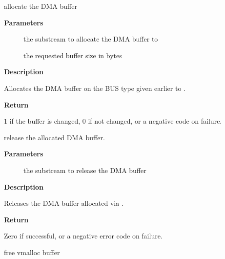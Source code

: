 \documentclass[a4paper,8pt,english]{sphinxmanual}
\begin{document}
\begin{fulllineitems}
\label{sound/kernel-api/alsa-driver-api:c.snd_pcm_lib_malloc_pages}
allocate the DMA buffer

\end{fulllineitems}


\textbf{Parameters}
\begin{description}
\item[{}] \leavevmode
the substream to allocate the DMA buffer to

\item[{}] \leavevmode
the requested buffer size in bytes

\end{description}

\textbf{Description}

Allocates the DMA buffer on the BUS type given earlier to
.

\textbf{Return}

1 if the buffer is changed, 0 if not changed, or a negative
code on failure.

\begin{fulllineitems}
\label{sound/kernel-api/alsa-driver-api:c.snd_pcm_lib_free_pages}
release the allocated DMA buffer.

\end{fulllineitems}


\textbf{Parameters}
\begin{description}
\item[{}] \leavevmode
the substream to release the DMA buffer

\end{description}

\textbf{Description}

Releases the DMA buffer allocated via .

\textbf{Return}

Zero if successful, or a negative error code on failure.

\begin{fulllineitems}
\label{sound/kernel-api/alsa-driver-api:c.snd_pcm_lib_free_vmalloc_buffer}
free vmalloc buffer

\end{fulllineitems}
\end{document}
